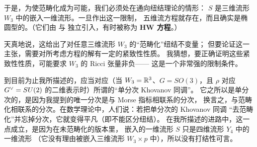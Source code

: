 
于是，为使范畴化成为可能，我们必须处在通向纽结理论的情形：
$S$ 是三维流形 $W_3$ 中的嵌入一维流形。一旦作出这一限制，
五维流方程就存在，而且确实是椭圆型的。（它们由 \cite{W5branes} 与 \cite{Haydys}
独立引入，有时被称为 \textbf{HW 方程}。）


天真地说，这给出了对任意三维流形 $W_3$ 的“范畴化”纽结不变量；
但要论证这一主张，需要对所考虑方程的解有一定的紧致性性质。
我猜想，要正确证明这些紧致性性质，可能要求 $W_3$ 的 Ricci 张量非负——
这是一个非常强的限制条件。


到目前为止我所描述的，应当对应（当 $W_3=\mathbb{R}^3$、$G=SO(3)$，且 $\rho$ 对应
$G^{\vee}=SU(2)$ 的二维表示时）所谓的“单分次 Khovanov 同调”。
它之所以是单分次的，是因为我提到的唯一分次是与 Morse 指标相联系的分次，
换言之，与范畴化相联系的分次。在数学理论中，人们说：若把单分次的 Khovanov 同调
“去范畴化”并忘掉分次，它就变得平凡（即不能区分纽结）。
在我所描述的进路中，这一点成立，是因为在未范畴化的版本里，
嵌入的一维流形 $S$ 只是四维流形 $Y_4$ 中的一维流形
（它没有理由被嵌入三维流形 $W_3\times p$ 中），所以没有打结性可言。



